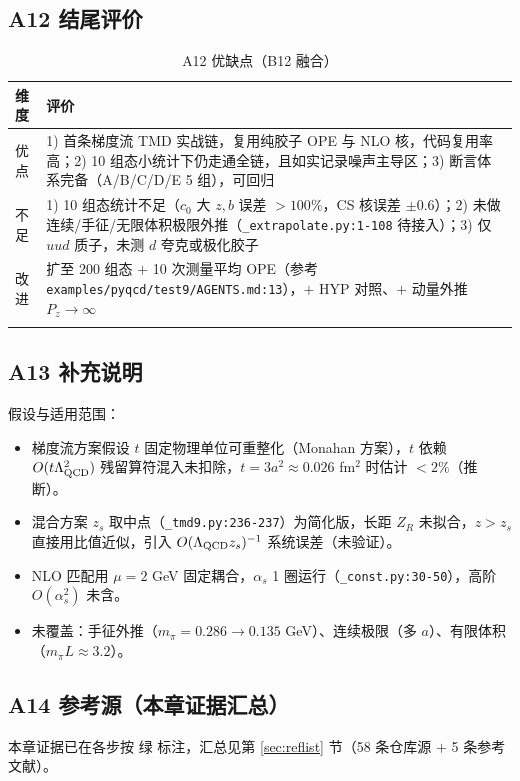 \documentclass[UTF8]{ctexart}
\begin{document}
\subsection{A12 结尾评价}
\small
\begin{xltabular}{\textwidth}{lX}
\toprule
维度 & 评价 \\
\midrule
\endhead
优点 & 1) 首条梯度流 TMD 实战链，复用纯胶子 OPE 与 NLO 核，代码复用率高；2) 10 组态小统计下仍走通全链，且如实记录噪声主导区；3) 断言体系完备（A/B/C/D/E 5 组），可回归 \\
不足 & 1) 10 组态统计不足（$c_0$ 大 $z,b$ 误差 $>100\%$，CS 核误差 $\pm0.6$）；2) 未做连续/手征/无限体积极限外推（\texttt{\nolinkurl{\_extrapolate.py:1-108}} 待接入）；3) 仅 $uud$ 质子，未测 $d$ 夸克或极化胶子 \\
改进 & 扩至 200 组态 $+$ 10 次测量平均 OPE（参考 \texttt{\nolinkurl{examples/pyqcd/test9/AGENTS.md:13}}），$+$ HYP 对照、$+$ 动量外推 $P_z\to\infty$ \\
\bottomrule
\caption{A12 优缺点（B12 融合）}
\end{xltabular}

\subsection{A13 补充说明}
\label{sec:a13}
假设与适用范围：
\begin{itemize}
\item 梯度流方案假设 $t$ 固定物理单位可重整化（Monahan 方案），$t$ 依赖 $O(t\Lambda_{\rm QCD}^2)$ 残留算符混入未扣除，$t=3a^2\approx0.026$ fm$^2$ 时估计 $<2\%$（\textcolor{relation}{推断}）。
\item 混合方案 $z_s$ 取中点（\texttt{\nolinkurl{\_tmd9.py:236-237}}）为简化版，长距 $Z_R$ 未拟合，$z>z_s$ 直接用比值近似，引入 $O(\Lambda_{\rm QCD}z_s)^{-1}$ 系统误差（\textcolor{warn}{未验证}）。
\item NLO 匹配用 $\mu=2$ GeV 固定耦合，$\alpha_s$ 1 圈运行（\texttt{\nolinkurl{\_const.py:30-50}}），高阶 $O(\alpha_s^2)$ 未含。
\item 未覆盖：手征外推（$m_\pi=0.286\to0.135$ GeV）、连续极限（多 $a$）、有限体积（$m_\pi L\approx3.2$）。
\end{itemize}

\subsection{A14 参考源（本章证据汇总）}
本章证据已在各步按 \textcolor{evidence}{绿} 标注，汇总见第 \ref{sec:reflist} 节（58 条仓库源 $+$ 5 条参考文献）。
\end{document}
